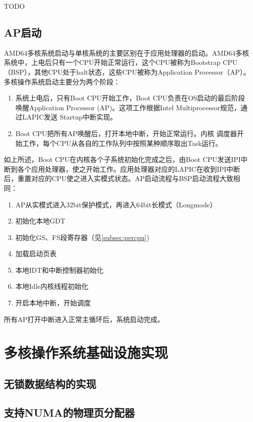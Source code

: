TODO

\subsection{AP启动}
AMD64多核系统启动与单核系统的主要区别在于应用处理器的启动。AMD64多核系统中，上电后只有一个CPU开始正常运行，这个CPU被称为Bootstrap CPU（BSP），其他CPU处于halt状态，这些CPU被称为Application Processor（AP）\cite{intelmp}。多核操作系统启动主要分为两个阶段：

	\begin{enumerate}
		\item 系统上电后，只有Boot CPU开始工作，Boot
	CPU负责在OS启动的最后阶段唤醒Application Processor
	(AP)。这项工作根据Intel Multiprocessor规范，通过LAPIC发送
	Startup中断实现。

		\item Boot CPU把所有AP唤醒后，打开本地中断，开始正常运行。内核
	调度器开始工作，每个CPU从各自的工作队列中按照某种顺序取出Task运行。
	\end{enumerate}


如上所述，Boot CPU在内核各个子系统初始化完成之后，由Boot CPU发送IPI中断到各个应用处理器，使之开始工作。应用处理器对应的LAPIC在收到IPI中断后，重置对应的CPU使之进入实模式状态。AP启动流程与BSP启动流程大致相同：

\begin{enumerate}
\item AP从实模式进入32bit保护模式，再进入64bit长模式（Longmode）
\item 初始化本地GDT
\item 初始化GS、FS段寄存器（见\ref{subsec:percpu})
\item 加载启动页表
\item 本地IDT和中断控制器初始化
\item 本地Idle内核线程初始化
\item 开启本地中断，开始调度
\end{enumerate}

所有AP打开中断进入正常主循环后，系统启动完成。

\section{多核操作系统基础设施实现}

\subsection{无锁数据结构的实现}

\subsection{支持NUMA的物理页分配器}

